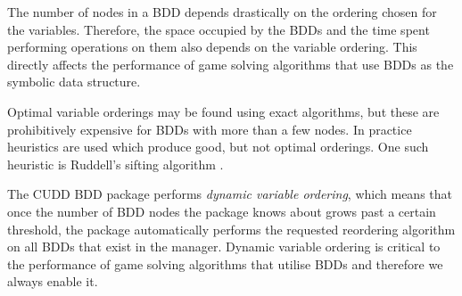 The number of nodes in a BDD depends drastically on the ordering chosen for the variables. Therefore, the space occupied by the BDDs and the time spent performing operations on them also depends on the variable ordering. This directly affects the performance of game solving algorithms that use BDDs as the symbolic data structure. 

Optimal variable orderings may be found using exact algorithms, but these are prohibitively expensive for BDDs with more than a few nodes. In practice heuristics are used which produce good, but not optimal orderings. One such heuristic is Ruddell's sifting algorithm \cite{sifting}.

The CUDD BDD package performs \emph{dynamic variable ordering}, which means that once the number of BDD nodes the package knows about grows past a certain threshold, the package automatically performs the requested reordering algorithm on all BDDs that exist in the manager. Dynamic variable ordering is critical to the performance of game solving algorithms that utilise BDDs and therefore we always enable it.

